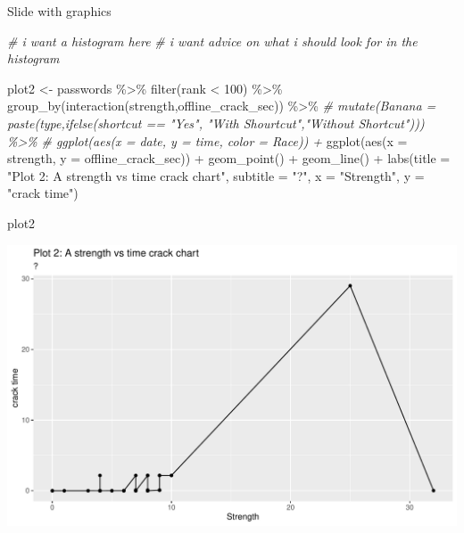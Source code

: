 \documentclass[10pt,ignorenonframetext,aspectratio=169]{beamer}
\newenvironment{Shaded}{\begin{snugshade}}{\end{snugshade}}
\newcommand{\AttributeTok}[1]{\textcolor[rgb]{0.77,0.63,0.00}{#1}}
\newcommand{\CommentTok}[1]{\textcolor[rgb]{0.56,0.35,0.01}{\textit{#1}}}
\newcommand{\DecValTok}[1]{\textcolor[rgb]{0.00,0.00,0.81}{#1}}
\newcommand{\FunctionTok}[1]{\textcolor[rgb]{0.00,0.00,0.00}{#1}}
\newcommand{\NormalTok}[1]{#1}
\newcommand{\OtherTok}[1]{\textcolor[rgb]{0.56,0.35,0.01}{#1}}
\newcommand{\SpecialCharTok}[1]{\textcolor[rgb]{0.00,0.00,0.00}{#1}}
\newcommand{\StringTok}[1]{\textcolor[rgb]{0.31,0.60,0.02}{#1}}
\renewenvironment{Shaded}{\color{black}\begin{snugshade}\color{black}}{\end{snugshade}}
\begin{document}
\begin{frame}[fragile]{Slide with graphics}
\begin{Shaded}
\begin{Highlighting}[]
\CommentTok{\# i want a histogram here}
\CommentTok{\# i want advice on what i should look for in the histogram}
\end{Highlighting}
\end{Shaded}

\begin{Shaded}
\begin{Highlighting}[]
\NormalTok{plot2 }\OtherTok{\textless{}{-}}\NormalTok{ passwords }\SpecialCharTok{\%\textgreater{}\%}
    \FunctionTok{filter}\NormalTok{(rank }\SpecialCharTok{\textless{}} \DecValTok{100}\NormalTok{) }\SpecialCharTok{\%\textgreater{}\%}
    \FunctionTok{group\_by}\NormalTok{(}\FunctionTok{interaction}\NormalTok{(strength,offline\_crack\_sec)) }\SpecialCharTok{\%\textgreater{}\%}
    \CommentTok{\# mutate(Banana = paste(type,ifelse(shortcut == "Yes", "With Shourtcut","Without Shortcut"))) \%\textgreater{}\%}
    \CommentTok{\# ggplot(aes(x = date, y = time, color = Race)) +}
    \FunctionTok{ggplot}\NormalTok{(}\FunctionTok{aes}\NormalTok{(}\AttributeTok{x =}\NormalTok{ strength, }\AttributeTok{y =}\NormalTok{ offline\_crack\_sec)) }\SpecialCharTok{+}
    \FunctionTok{geom\_point}\NormalTok{() }\SpecialCharTok{+}
    \FunctionTok{geom\_line}\NormalTok{() }\SpecialCharTok{+}
    \FunctionTok{labs}\NormalTok{(}\AttributeTok{title =} \StringTok{"Plot 2: A strength vs time crack chart"}\NormalTok{, }\AttributeTok{subtitle =} \StringTok{"?"}\NormalTok{, }\AttributeTok{x =} \StringTok{"Strength"}\NormalTok{, }\AttributeTok{y =} \StringTok{"crack time"}\NormalTok{)}

\NormalTok{plot2}
\end{Highlighting}
\end{Shaded}

\begin{center}\includegraphics{Untitled_files/figure-beamer/plot2d-1} \end{center}


\end{frame}
\end{document}

